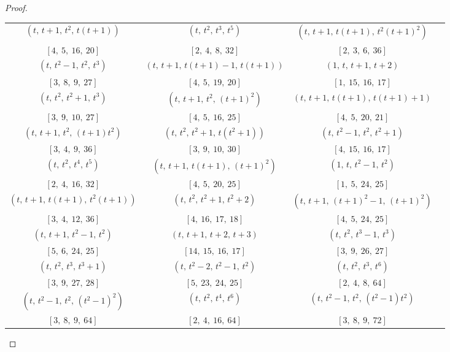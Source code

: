 \documentclass[conference]{IEEEtran}
\begin{document}
\begin{proof}
\begin{table}[ht!]
\begin{tabular}{|*{4}{c|}}
$\left(t,\,t{+}1,\,t^2,\,t(t{+}1)\right)$ & $\left(t,\,t^2,\,t^3,\,t^5\right)$ & $\left(t,\,t{+}1,\,t(t{+}1),\,t^2(t{+}1)^2\right)$\\
$[4,\ 5,\ 16,\ 20]$ & $[2,\ 4,\ 8,\ 32]$ & $[2,\ 3,\ 6,\ 36]$\\\hline
$\left(t,\,t^2{-}1,\,t^2,\,t^3\right)$ & $\left(t,\,t{+}1,\,t(t{+}1){-}1,\,t(t{+}1)\right)$ & $\left(1,\,t,\,t{+}1,\,t{+}2\right)$\\
$[3,\ 8,\ 9,\ 27]$ & $[4,\ 5,\ 19,\ 20]$ & $[1,\ 15,\ 16,\ 17]$\\\hline
$\left(t,\,t^2,\,t^2{+}1,\,t^3\right)$ & $\left(t,\,t{+}1,\,t^2,\,(t{+}1)^2\right)$ & $\left(t,\,t{+}1,\,t(t{+}1),\,t(t{+}1){+}1\right)$\\
$[3,\ 9,\ 10,\ 27]$ & $[4,\ 5,\ 16,\ 25]$ & $[4,\ 5,\ 20,\ 21]$\\\hline
$\left(t,\,t{+}1,\,t^2,\,(t{+}1)t^2\right)$ & $\left(t,\,t^2,\,t^2{+}1,\,t\left(t^2{+}1\right)\right)$ & $\left(t,\,t^2{-}1,\,t^2,\,t^2{+}1\right)$\\
$[3,\ 4,\ 9,\ 36]$ & $[3,\ 9,\ 10,\ 30]$ & $[4,\ 15,\ 16,\ 17]$\\\hline
$\left(t,\,t^2,\,t^4,\,t^5\right)$ & $\left(t,\,t{+}1,\,t(t{+}1),\,(t{+}1)^2\right)$ & $\left(1,\,t,\,t^2{-}1,\,t^2\right)$\\
$[2,\ 4,\ 16,\ 32]$ & $[4,\ 5,\ 20,\ 25]$ & $[1,\ 5,\ 24,\ 25]$\\\hline
$\left(t,\,t{+}1,\,t(t{+}1),\,t^2(t{+}1)\right)$ & $\left(t,\,t^2,\,t^2{+}1,\,t^2{+}2\right)$ & $\left(t,\,t{+}1,\,(t{+}1)^2{-}1,\,(t{+}1)^2\right)$\\
$[3,\ 4,\ 12,\ 36]$ & $[4,\ 16,\ 17,\ 18]$ & $[4,\ 5,\ 24,\ 25]$\\\hline
$\left(t,\,t{+}1,\,t^2{-}1,\,t^2\right)$ & $\left(t,\,t{+}1,\,t{+}2,\,t{+}3\right)$ & $\left(t,\,t^2,\,t^3{-}1,\,t^3\right)$\\
$[5,\ 6,\ 24,\ 25]$ & $[14,\ 15,\ 16,\ 17]$ & $[3,\ 9,\ 26,\ 27]$\\\hline
$\left(t,\,t^2,\,t^3,\,t^3{+}1\right)$ & $\left(t,\,t^2{-}2,\,t^2{-}1,\,t^2\right)$ & $\left(t,\,t^2,\,t^3,\,t^6\right)$\\
$[3,\ 9,\ 27,\ 28]$ & $[5,\ 23,\ 24,\ 25]$ & $[2,\ 4,\ 8,\ 64]$\\\hline
$\left(t,\,t^2{-}1,\,t^2,\,\left(t^2{-}1\right)^2\right)$ & $\left(t,\,t^2,\,t^4,\,t^6\right)$ & $\left(t,\,t^2{-}1,\,t^2,\,\left(t^2{-}1\right)t^2\right)$\\
$[3,\ 8,\ 9,\ 64]$ & $[2,\ 4,\ 16,\ 64]$ & $[3,\ 8,\ 9,\ 72]$\\\hline

\end{tabular}
\end{table}
\end{proof}
\end{document}
